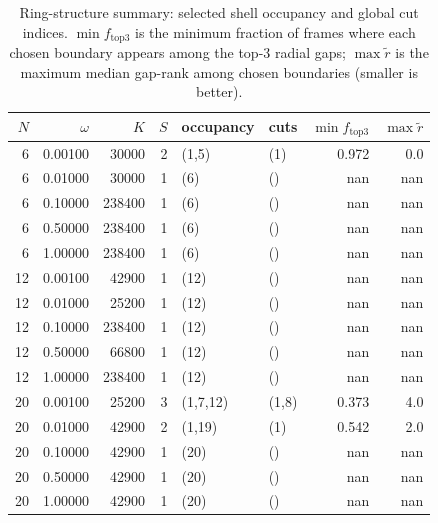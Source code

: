\begin{table}[t]
\centering
\small
\setlength{\tabcolsep}{4pt}
\renewcommand{\arraystretch}{1.15}
\begin{tabular}{r r r r l l r r}
\toprule
$N$ & $\omega$ & $K$ & $S$ & occupancy & cuts & $\min f_{\mathrm{top}3}$ & $\max \tilde{r}$ \\
\midrule
6 & 0.00100 & 30000 & 2 & (1,5) & (1) & 0.972 & 0.0 \\
6 & 0.01000 & 30000 & 1 & (6) & () & nan & nan \\
6 & 0.10000 & 238400 & 1 & (6) & () & nan & nan \\
6 & 0.50000 & 238400 & 1 & (6) & () & nan & nan \\
6 & 1.00000 & 238400 & 1 & (6) & () & nan & nan \\
12 & 0.00100 & 42900 & 1 & (12) & () & nan & nan \\
12 & 0.01000 & 25200 & 1 & (12) & () & nan & nan \\
12 & 0.10000 & 238400 & 1 & (12) & () & nan & nan \\
12 & 0.50000 & 66800 & 1 & (12) & () & nan & nan \\
12 & 1.00000 & 238400 & 1 & (12) & () & nan & nan \\
20 & 0.00100 & 25200 & 3 & (1,7,12) & (1,8) & 0.373 & 4.0 \\
20 & 0.01000 & 42900 & 2 & (1,19) & (1) & 0.542 & 2.0 \\
20 & 0.10000 & 42900 & 1 & (20) & () & nan & nan \\
20 & 0.50000 & 42900 & 1 & (20) & () & nan & nan \\
20 & 1.00000 & 42900 & 1 & (20) & () & nan & nan \\
\bottomrule
\end{tabular}
\caption{Ring-structure summary: selected shell occupancy and global cut indices. $\min f_{\mathrm{top}3}$ is the minimum fraction of frames where each chosen boundary appears among the top-3 radial gaps; $\max \tilde{r}$ is the maximum median gap-rank among chosen boundaries (smaller is better).}
\end{table}